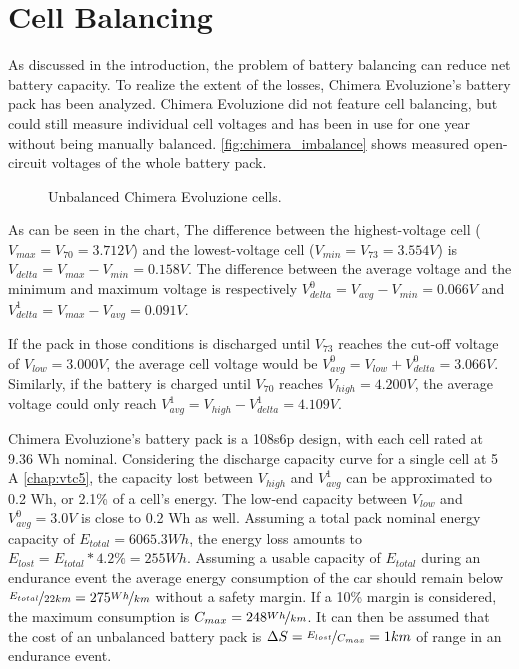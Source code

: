 \chapter{Cell Balancing}
\label{cha:balancing}
As discussed in the introduction, the problem of battery balancing can reduce net battery capacity. To realize the extent of the losses, Chimera Evoluzione's battery pack has been analyzed. Chimera Evoluzione did not feature cell balancing, but could still measure individual cell voltages and has been in use for one year without being manually balanced. \autoref{fig:chimera_imbalance} shows measured open-circuit voltages of the whole battery pack.

\begin{figure}[h]
    \centering
    
    \caption{Unbalanced Chimera Evoluzione cells.}
    \label{fig:chimera_imbalance}
\end{figure}

As can be seen in the chart, The difference between the highest-voltage cell ($V_{max} = V_{70} = 3.712 V$) and the lowest-voltage cell ($V_{min} = V_{73} = 3.554 V$) is $V_{delta}=V_{max}-V_{min}=0.158 V$. The difference between the average voltage and the minimum and maximum voltage is respectively $V^0_{delta} = V_{avg} - V_{min} = 0.066 V$ and $V^1_{delta} = V_{max} - V_{avg} = 0.091 V$.

If the pack in those conditions is discharged until $V_{73}$ reaches the cut-off voltage of $V_{low} = 3.000 V$, the average cell voltage would be $V^0_{avg} = V_{low} + V^0_{delta} = 3.066 V $. Similarly, if the battery is charged until $V_{70}$ reaches $V_{high} = 4.200 V$, the average voltage could only reach $V^1_{avg} = V_{high} - V^1_{delta} = 4.109 V$.

Chimera Evoluzione's battery pack is a 108s6p design, with each cell rated at 9.36 Wh nominal. Considering the discharge capacity curve for a single cell at 5 A \autoref{chap:vtc5}, the capacity lost between $V_{high}$ and $V^1_{avg}$ can be approximated to 0.2 Wh, or 2.1\% of a cell's energy. The low-end capacity between $V_{low}$ and $V^0_{avg} = 3.0 V$ is close to 0.2 Wh as well. Assuming a total pack nominal energy capacity of $E_{total} = 6065.3 Wh$, the energy loss amounts to $E_{lost} = E_{total}*4.2\% = 255 Wh$. Assuming a usable capacity of $E_{total}$ during an endurance event the average energy consumption of the car should remain below $\nicefrac{E_{total}}{22 km}=275\nicefrac{Wh}{km}$ without a safety margin. If a 10\% margin is considered, the maximum consumption is $C_{max} = 248\nicefrac{Wh}{km}$. It can then be assumed that the cost of an unbalanced battery pack is $\Delta S = \nicefrac{E_{lost}}{C_{max}} = 1 km$ of range in an endurance event.

